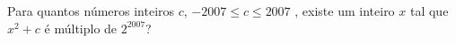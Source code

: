 Para quantos números inteiros $c$, $-2007 \le c \le 2007$ , existe um inteiro $x$ tal que $x^2 + c$ é múltiplo de $2^{2007}$?